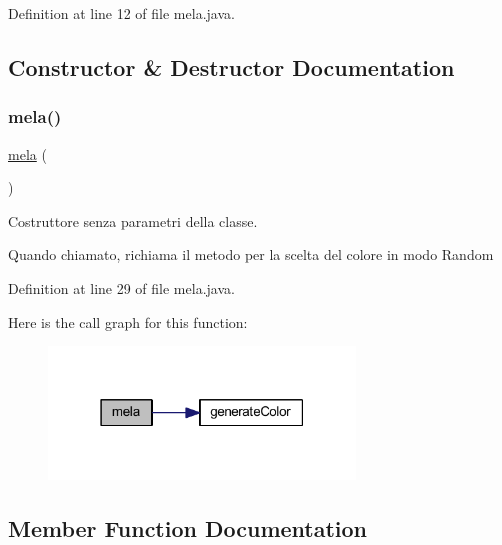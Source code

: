 Definition at line 12 of file mela.\+java.



\subsection{Constructor \& Destructor Documentation}
\mbox{\label{class_snake_1_1game_1_1vipera_1_1mela_ac294a8928f164db9f4c965b86409b4df}} 
\subsubsection{\texorpdfstring{mela()}{mela()}}
{\footnotesize\ttfamily \mbox{\hyperlink{class_snake_1_1game_1_1vipera_1_1mela}{mela}} (\begin{DoxyParamCaption}{ }\end{DoxyParamCaption})}



Costruttore senza parametri della classe. 

Quando chiamato, richiama il metodo per la scelta del colore in modo Random 

Definition at line 29 of file mela.\+java.

Here is the call graph for this function\+:
\nopagebreak
\begin{figure}[H]
\begin{center}
\leavevmode
\includegraphics[width=231pt]{class_snake_1_1game_1_1vipera_1_1mela_ac294a8928f164db9f4c965b86409b4df_cgraph}
\end{center}
\end{figure}


\subsection{Member Function Documentation}
\mbox{\label{class_snake_1_1game_1_1vipera_1_1mela_a728ec55c7b71728d444fd811341f704c}} 
